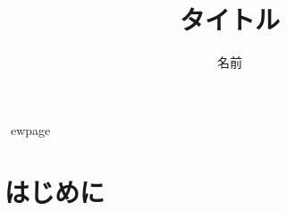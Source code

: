 \documentclass{jsarticle}
\title{タイトル}
\author{名前} %
\begin{document}
\maketitle

\tableofcontents
\
ewpage

\section{はじめに}
\end{document}
